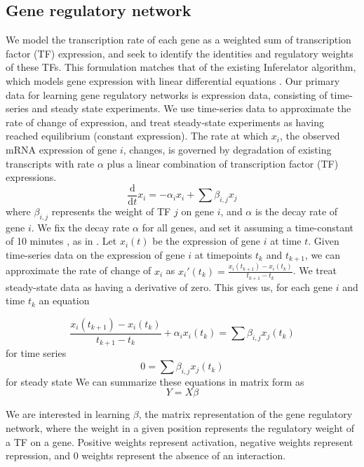 \documentclass[11pt]{article}
\begin{document}
\subsection{Gene regulatory network}
We model the transcription rate of each gene as a weighted sum of transcription factor (TF) expression, and seek to identify the identities and regulatory weights of these TFs. This formulation matches that of the existing Inferelator algorithm, which models gene expression with linear differential equations \cite{bonneau_inferelator:_2006-1}. Our primary data for learning gene regulatory networks is expression data, consisting of time-series and steady state experiments. We use time-series data to approximate the rate of change of expression, and treat steady-state experiments as having reached equilibrium (constant expression). The rate at which $x_{i}$, the observed mRNA expression of gene $i$, changes, is governed by degradation of existing transcripts with rate $\alpha$ plus a linear combination of transcription factor (TF) expressions. 
\begin{equation}
\frac{\mathrm d}{\mathrm d t} x_i = -\alpha_{i}x_{i} + \sum \beta_{i,j}x_{j}
\end{equation}
where $\beta_{i,j}$ represents the weight of TF $j$ on gene $i$, and $\alpha$ is the decay rate of gene $i$. We fix the decay rate $\alpha$ for all genes, and set it assuming a time-constant of 10 minutes \cite{hambraeus_genome-wide_2003, selinger_global_2003}, as in \cite{greenfield_robust_2013}. Let $x_i(t)$ be the expression of gene $i$ at time $t$. Given time-series data on the expression of gene $i$ at timepoints $t_k$ and $t_{k+1}$, we can approximate the rate of change of $x_i$ as $x_i'(t_k)=\frac{x_i(t_{k+1})-x_i(t_k)}{t_{k+1}-t_k}$. We treat steady-state data as having a derivative of zero. This gives us, for each gene $i$ and time $t_{k}$ an equation

\begin{equation}
\frac{x_i(t_{k+1})-x_i(t_k)}{t_{k+1}-t_k} + \alpha_{i}x_{i}(t_k)= \sum \beta_{i,j}x_{j}(t_k)
\end{equation}
for time series
\begin{equation}
0 = \sum \beta_{i,j}x_{j}(t_k)
\end{equation}
for steady state
\noindent We can summarize these equations in matrix form as
\begin{equation}
Y = X \beta 
\end{equation}

We are interested in learning $\beta$, the matrix representation of the gene regulatory network, where the weight in a given position represents the regulatory weight of a TF on a gene. Positive weights represent activation, negative weights represent repression, and 0 weights represent the absence of an interaction. 
\end{document}
